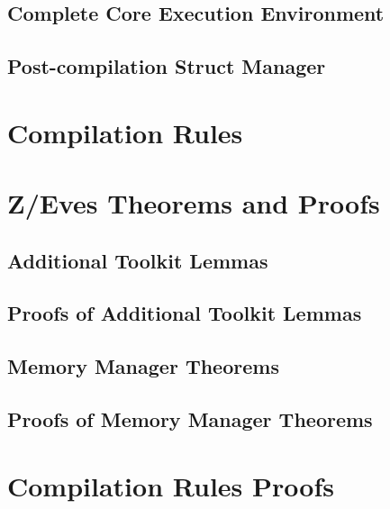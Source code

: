 \documentclass[a4paper,10pt]{report}
\begin{document}
\section{Complete Core Execution Environment}


\section{Post-compilation Struct Manager}
\label{struct-manager-appendix}


\chapter{Compilation Rules}


\chapter{Z/Eves Theorems and Proofs}
\label{zeves-proofs}

\section{Additional Toolkit Lemmas}
\label{additional-lemmas}
\normalsize

 

\section{Proofs of Additional Toolkit Lemmas}
\label{additional-lemmas-proofs}
\scriptsize





\section{Memory Manager Theorems}
\label{memory-manager-theorems}
\normalsize



\section{Proofs of Memory Manager Theorems}
\label{memory-manager-proofs}
\scriptsize



\chapter{Compilation Rules Proofs}



\end{document}
